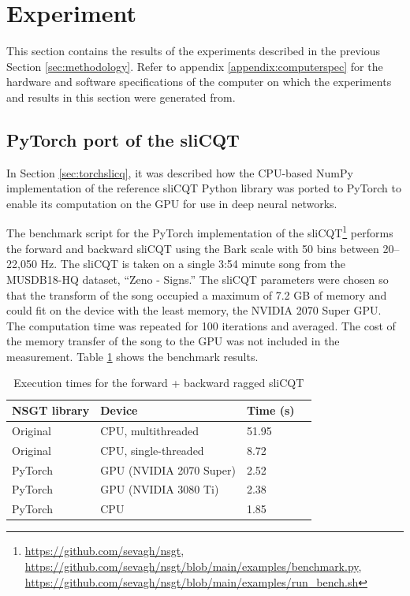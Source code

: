 \documentclass[report.tex]{subfiles}
\begin{document}
\section{Experiment}
\label{sec:experiment}

This section contains the results of the experiments described in the previous Section \ref{sec:methodology}. Refer to appendix \ref{appendix:computerspec} for the hardware and software specifications of the computer on which the experiments and results in this section were generated from.

\subsection{PyTorch port of the sliCQT}
\label{sec:gpuexperimentpytorch}

In Section \ref{sec:torchslicq}, it was described how the CPU-based NumPy implementation of the reference sliCQT Python library was ported to PyTorch to enable its computation on the GPU for use in deep neural networks.

The benchmark script for the PyTorch implementation of the sliCQT\footnote{\url{https://github.com/sevagh/nsgt}, \url{https://github.com/sevagh/nsgt/blob/main/examples/benchmark.py}, \url{https://github.com/sevagh/nsgt/blob/main/examples/run_bench.sh}} performs the forward and backward sliCQT using the Bark scale with 50 bins between 20--22,050 Hz. The sliCQT is taken on a single 3:54 minute song from the MUSDB18-HQ dataset, ``Zeno - Signs.'' The sliCQT parameters were chosen so that the transform of the song occupied a maximum of 7.2 GB of memory and could fit on the device with the least memory, the NVIDIA 2070 Super GPU. The computation time was repeated for 100 iterations and averaged. The cost of the memory transfer of the song to the GPU was not included in the measurement. Table \ref{table:nsgttorchresultsragged} shows the benchmark results.

\begin{table}[ht]
	\centering
	\caption{Execution times for the forward + backward ragged sliCQT}
	\label{table:nsgttorchresultsragged}
	\begin{tabular}{ |l|l|l|l| }
	 \hline
		NSGT library & Device & Time (s) \\
	 \hline
	 \hline
		Original & CPU, multithreaded & 51.95  \\
	 \hline
		Original & CPU, single-threaded & 8.72  \\
	 \hline
		PyTorch & GPU (NVIDIA 2070 Super) & 2.52 \\
	 \hline
		PyTorch & GPU (NVIDIA 3080 Ti) &  2.38 \\
	 \hline
		PyTorch & CPU & 1.85  \\
	 \hline
\end{tabular}
\end{table}
\end{document}
